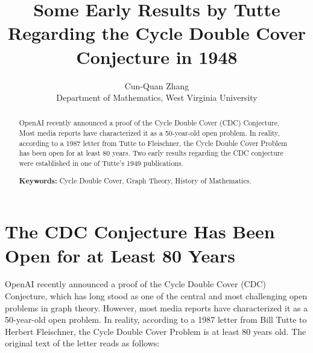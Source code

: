 \documentclass[11pt]{article}
\begin{document}
\newtheorem{theorem}{Theorem}[section]
\newtheorem{corollary}[theorem]{Corollary}
\newtheorem{definition}[theorem]{Definition}
\newtheorem{conjecture}[theorem]{Conjecture}
\newtheorem{observation}[theorem]{Observation}
\newtheorem{problem}[theorem]{Problem}
\newtheorem{lemma}[theorem]{Lemma}
\newtheorem{newlemma}{New-Lemma}
\newtheorem{proposition}[theorem]{Proposition}
\newtheorem{construction}[theorem]{Construction}




\title{Some Early Results by Tutte Regarding the Cycle Double Cover Conjecture in 1948}
\author{Cun-Quan Zhang \\ Department of Mathematics, West Virginia University}
\date{}
\maketitle

\begin{abstract}OpenAI recently announced a proof of the Cycle Double Cover (CDC) Conjecture.
Most media reports have characterized it as a 50-year-old open problem.
In reality, according to a 1987 letter from Tutte to Fleischner, the Cycle Double Cover Problem
 has been open for at least 80 years.
Two early results regarding the CDC conjecture were established in one of Tutte's 1949 publications.

\noindent
{\bf Keywords:} Cycle Double Cover, Graph Theory, History of Mathematics.
\end{abstract}

\section{The CDC Conjecture Has Been Open for at Least 80 Years}
 OpenAI \cite{OpenAI2026} recently announced a proof of the Cycle Double Cover (CDC) Conjecture, which has long stood as one of the central and most challenging open problems in graph theory.
 However, most media reports have characterized it as a 50-year-old open problem.
  In reality, according to a 1987 letter from Bill Tutte to Herbert Fleischner, the Cycle Double Cover Problem
   is at least 80 years old.
  The original text of the letter reads as follows:
\end{document}
